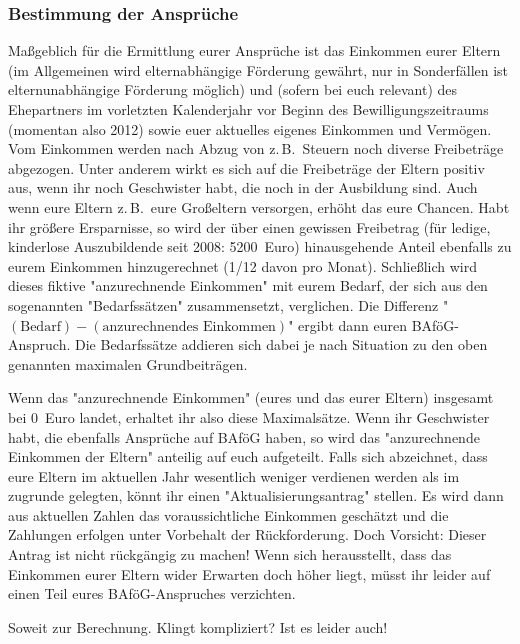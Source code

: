 \begin{multicols*}{2}
\subsubsection*{Bestimmung der Ansprüche}
Maßgeblich für die Ermittlung eurer Ansprüche ist das Einkommen eurer Eltern (im Allgemeinen wird elternabhängige Förderung gewährt, nur in Sonderfällen ist elternunabhängige Förderung möglich) und (sofern bei euch relevant) des Ehepartners im vorletzten Kalenderjahr vor Beginn des Bewilligungszeitraums (momentan also 2012) sowie euer aktuelles eigenes Einkommen und Vermögen. Vom Einkommen werden nach Abzug von z.\,B.\ Steuern noch diverse Freibeträge abgezogen. Unter anderem wirkt es sich auf die Freibeträge der Eltern positiv aus, wenn ihr noch Geschwister habt, die noch in der Ausbildung sind. Auch wenn eure Eltern z.\,B.\ eure Großeltern versorgen, erhöht das eure Chancen. Habt ihr größere Ersparnisse, so wird der über einen gewissen Freibetrag (für ledige, kinderlose Auszubildende seit 2008: \num{5200}~Euro) hinausgehende Anteil ebenfalls zu eurem Einkommen hinzugerechnet (\num{1/12} davon pro Monat). Schließlich wird dieses fiktive "anzurechnende Einkommen" mit eurem Bedarf, der sich aus den sogenannten "Bedarfssätzen" zusammensetzt, verglichen. Die Differenz "$(\text{Bedarf}) - (\text{anzurechnendes Einkommen})$" ergibt dann euren BAföG-Anspruch. Die Bedarfssätze addieren sich dabei je nach Situation zu den oben genannten maximalen Grundbeiträgen.

Wenn das "anzurechnende Einkommen" (eures und das eurer Eltern) insgesamt bei 0~Euro landet, erhaltet ihr also diese Maximalsätze. Wenn ihr Geschwister habt, die ebenfalls Ansprüche auf BAföG haben, so wird das "anzurechnende Einkommen der Eltern" anteilig auf euch aufgeteilt. Falls sich abzeichnet, dass eure Eltern im aktuellen Jahr wesentlich weniger verdienen werden als im zugrunde gelegten, könnt ihr einen "Aktualisierungsantrag" stellen. Es wird dann aus aktuellen Zahlen das voraussichtliche Einkommen geschätzt und die Zahlungen erfolgen unter Vorbehalt der Rückforderung. Doch Vorsicht: Dieser Antrag ist nicht rückgängig zu machen! Wenn sich herausstellt, dass das Einkommen eurer Eltern wider Erwarten doch höher liegt, müsst ihr leider auf einen Teil eures BAföG-Anspruches verzichten.

Soweit zur Berechnung. Klingt kompliziert? Ist es leider auch!


\end{multicols*}
